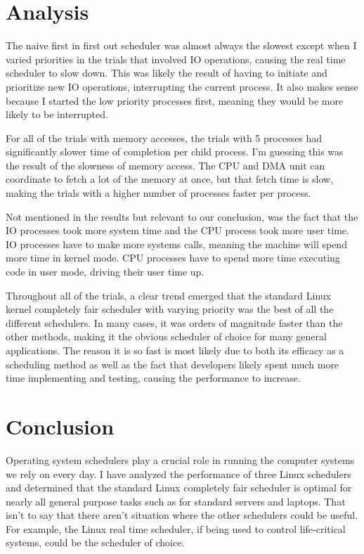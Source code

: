 \documentclass{article}
\begin{document}
\section{Analysis}

The naive first in first out scheduler was almost always the slowest except when I varied priorities in the trials that involved IO operations, causing the real time scheduler to slow down. This was likely the result of having to initiate and prioritize new IO operations, interrupting the current process. It also makes sense because I started the low priority processes first, meaning they would be more likely to be interrupted.

For all of the trials with memory accesses, the trials with 5 processes had significantly slower time of completion per child process. I’m guessing this was the result of the slowness of memory access. The CPU and DMA unit can coordinate to fetch a lot of the memory at once, but that fetch time is slow, making the trials with a higher number of processes faster per process.

Not mentioned in the results but relevant to our conclusion, was the fact that the IO processes took more system time and the CPU process took more user time. IO processes have to make more systems calls, meaning the machine will spend more time in kernel mode. CPU processes have to spend more time executing code in user mode, driving their user time up.

Throughout all of the trials, a clear trend emerged that the standard Linux kernel completely fair scheduler with varying priority was the best of all the different schedulers. In many cases, it was orders of magnitude faster than the other methods, making it the obvious scheduler of choice for many general applications. The reason it is so fast is most likely due to both its efficacy as a scheduling method as well as the fact that developers likely spent much more time implementing and testing, causing the performance to increase.

\section{Conclusion}

Operating system schedulers play a crucial role in running the computer systems we rely on every day. I have analyzed the performance of three Linux schedulers and determined that the standard Linux completely fair scheduler is optimal for nearly all general purpose tasks such as for standard servers and laptops. That isn’t to say that there aren’t situation where the other schedulers could be useful. For example, the Linux real time scheduler, if being used to control life-critical systems, could be the scheduler of choice.
\end{document}
